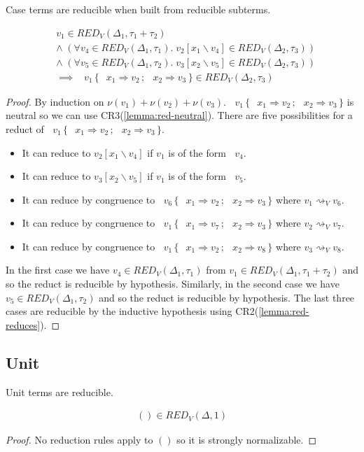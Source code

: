 \documentclass[acmsmall, screen, review, anonymous]{acmart}
\theoremstyle{definition}
\newcommand{\seq}{\,;\,}
\newcommand{\inlname}{\mathop{\mathtt{in}_L}}
\newcommand{\inl}[1]{\inlname #1}
\newcommand{\inrname}{\mathop{\mathtt{in}_R}}
\newcommand{\inr}[1]{\inrname #1}
\newcommand{\casename}{\mathtt{case}}
\newcommand{\casemname}{\casename^{m}}
\newcommand{\casem}[5]{\mathop{\casemname} #1 \,\{\,\inl{#2} \Rightarrow #3 \seq \inr{#4} \Rightarrow #5 \,\}}
\newcommand{\sub}[2]{[#1\backslash#2]}
\newcommand{\sbst}[3]{#1\sub{#2}{#3}}
\newcommand{\stepstoname}{\rightsquigarrow}
\newcommand{\stepstov}{\stepstoname_V}
\newcommand{\bound}[1]{\nu(#1)}
\newcommand{\redname}{RED}
\newcommand{\redvname}{\redname_{V}}
\newcommand{\redv}[2]{\redvname{({#1},{#2})}}
\begin{document}
Case terms are reducible when built from reducible subterms.
\begin{lemma}
\label{lemma:red-case}
\begin{align*}
  &v_1 \in \redv{\Delta_1}{\tau_1 + \tau_2} \\
  &\wedge \; (\forall v_4 \in \redv{\Delta_1}{\tau_1}. \; \sbst{v_2}{x_1}{v_4} \in \redv{\Delta_2}{\tau_3}) \\
  &\wedge \; (\forall v_5 \in \redv{\Delta_1}{\tau_2}. \; \sbst{v_3}{x_2}{v_5} \in \redv{\Delta_2}{\tau_3}) \\
  &\implies \; \casem{v_1}{x_1}{v_2}{x_2}{v_3} \in \redv{\Delta_2}{\tau_3}
\end{align*}
\end{lemma}
\begin{proof}
  By induction on $\bound{v_1} + \bound{v_2} + \bound{v_3}$.
  $\casem{v_1}{x_1}{v_2}{x_2}{v_3}$ is neutral so we can use CR3(\ref{lemma:red-neutral}). There are five
  possibilities for a reduct of $\casem{v_1}{x_1}{v_2}{x_2}{v_3}$.
  \begin{itemize}
  \item It can reduce to $\sbst{v_2}{x_1}{v_4}$ if $v_1$ is of the form $\inl{v_4}$.
  \item It can reduce to $\sbst{v_3}{x_2}{v_5}$ if $v_1$ is of the form $\inr{v_5}$.
  \item It can reduce by congruence to $\casem{v_6}{x_1}{v_2}{x_2}{v_3}$ where $v_1 \stepstov v_6$.
  \item It can reduce by congruence to $\casem{v_1}{x_1}{v_7}{x_2}{v_3}$ where $v_2 \stepstov v_7$.
  \item It can reduce by congruence to $\casem{v_1}{x_1}{v_2}{x_2}{v_8}$ where $v_3 \stepstov v_8$.
  \end{itemize}
  In the first case we have $v_4 \in \redv{\Delta_1}{\tau_1}$ from $v_1 \in \redv{\Delta_1}{\tau_1 + \tau_2}$ 
  and so the reduct is reducible by hypothesis. Similarly, in the second case we have $v_5 \in \redv{\Delta_1}{\tau_2}$
  and so the reduct is reducible by hypothesis. The last three cases
  are reducible by the inductive hypothesis using
  CR2(\ref{lemma:red-reduces}).
\end{proof}

\subsection{Unit}

Unit terms are reducible.
\begin{lemma}
\label{lemma:red-unit}
\begin{align*}
  () \in \redv{\Delta}{1}
\end{align*}
\end{lemma}
\begin{proof}
  No reduction rules apply to $()$ so it is strongly normalizable.
\end{proof}
\end{document}
